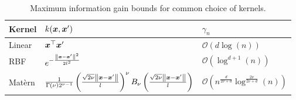    \begin{table}[ht!]
\begin{center}
\caption{Maximum information gain bounds for common choice of kernels.}
\label{table: gamma magnitude bounds for different kernels}
\begin{tabular}{@{}lll@{}}
\toprule
Kernel&$k({\bm{x}}, {\bm{x}}')$ & $\gamma_n$ \\ \midrule
    Linear &${\bm{x}}^\top {\bm{x}}'$   & $\mathcal{O}\left(d \log(n)\right)$                    \\
    RBF &$e^{-\frac{\left\lVert{\bm{x}} - {\bm{x}}'\right\rVert^2}{2l^2}}$& $\mathcal{O}\left( \log^{d+1}(n)\right)$                    \\
    Matèrn &$\frac{1}{\Gamma(\nu)2^{\nu - 1}}\left(\frac{\sqrt{2\nu}\left\lVert{\bm{x}}-{\bm{x}}'\right\rVert}{l}\right)^{\nu}B_{\nu}\left(\frac{\sqrt{2\nu}\left\lVert{\bm{x}}-{\bm{x}}'\right\rVert}{l}\right)$  & $\mathcal{O}\left(n^{\frac{d}{2\nu + d}}\log^{\frac{2\nu}{2\nu+d}}(n)\right)$                     \\ \bottomrule
\end{tabular}
\end{center}
\end{table}

